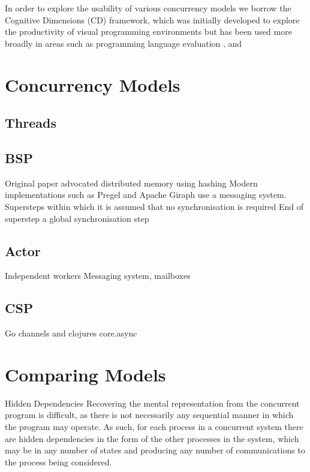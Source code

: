 \documentclass{sig-alternate}
\begin{document}
In order to explore the usability of various concurrency models we borrow the Cognitive Dimensions \cite{green89:_cognit_dimen_notat} (CD) framework, which was initially developed to explore the productivity of visual programming environments but has been used more broadly in areas such as programming language evaluation \cite{enpl}, and 



\section{Concurrency Models}
\subsection{Threads}


\subsection{BSP}
Original paper advocated distributed memory using hashing
Modern implementations such as Pregel and Apache Giraph use a messaging system.
Supersteps within which it is assumed that no synchronisation is required
End of superstep a global synchronisation step

\subsection{Actor}
Independent workers
Messaging system, mailboxes

\subsection{CSP}
Go channels and clojures core.async

\subsection{}

\section{Comparing Models}

Hidden Dependencies
Recovering the mental representation from the concurrent program is difficult, as there is not necessarily any sequential manner in which the program may operate. As such, for each process in a concurrent system there are hidden dependencies in the form of the other processes in the system, which may be in any number of states and producing any number of communications to the process being considered.
\end{document}
